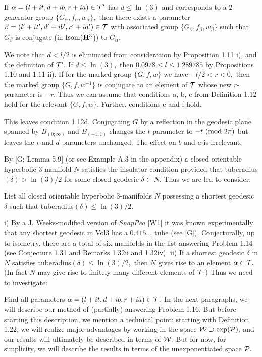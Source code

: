   If $\alpha=(l+it, d+ib, r+ia)\in {\cal T}^{\prime}$ has $d\le \ln(3)$ and
corresponds to a $2$\/{\rm -}\/generator group
$\{G_\alpha,f_\alpha,w_\alpha\},$ then there exists a parameter $\beta=(l^{\prime}+it^{\prime}, d^{\prime}+ib^{\prime}, r^{\prime}+ia^{\prime})\in {\cal T}$ 
with associated group $\{G_\beta,f_\beta, w_\beta\}$ such that $G_\beta$ is conjugate (in ${\rm Isom}({\bf H}^3$)) to $G_\alpha.$ 
\endproclaim

 We note that $d < l/2$ is eliminated from consideration by Proposition 1.11 i), and the definition of ${\cal T}^\prime.$ If $d\le \ln(3),$
then
$0.0978\le l\le 1.289785$ by Propositions 1.10 and 1.11 ii).  If for the marked group $\{G, f, w\}$ we have 
$-l/2<r<0,$ then the marked group
$\{G,f,w^{-1}\}$ is conjugate to an element of ${\cal T}$ whose new
$r$-parameter is $-r.$  Thus we can assume that
conditions a, b, c from Definition 1.12 hold for the relevant $\{G,f,w\}.$  Further,    conditions e and f \pagebreak hold.

This leaves condition 1.12d.  Conjugating $G$ by a
reflection in the geodesic plane spanned
by $B_{(0;\infty)}$ and $B_{(-1;1)}$ changes the $t$-parameter to 
$-t \ ({\rm mod}\ 2\pi)$
but leaves the $r$ and $d$ parameters unchanged.
The effect on $b$ and $a$ is irrelevant.  \enddemo


 
By [G; Lemma 5.9] (or see Example A.3 in the appendix) a closed orientable hyperbolic $3$-manifold $N$
satisfies the insulator condition provided that
tuberadius$(\delta) > \ln(3)/2$ for some closed geodesic $\delta\subset N.$  Thus we
are led to consider:

   List all closed orientable hyperbolic $3$-manifolds $N$
possessing a shortest geodesic $\delta$ such that tuberadius$(\delta)\le \ln(3)/2.$
\enddemo

  i)  By a J. Weeks-modified version of {\it SnapPea} [W1] it was known
experimentally  that any shortest
geodesic in Vol3 has a $0.415\ldots$ tube  (see [G]).  Conjecturally, up to isometry, there are a total of six manifolds in the list answering Problem 1.14 (see Conjecture 1.31 and Remarks 1.32ii and 1.32iv).
ii)  If a shortest geodesic $\delta$ in $N$ satisfies tuberadius$(\delta)\le
\ln(3)/2,$ then $N$ gives
rise to an element $\alpha\in {\cal T}.$  (In fact $N$ may give rise to finitely many different elements of ${\cal T}.$)  
Thus we need to investigate:
\enddemo

  Find all parameters $\alpha=(l+it, d+ib, r+ia) \in {\cal T}.$ 
\enddemo
{}
In the next     paragraphs, we will describe our method of (partially) answering Problem 1.16.  But before starting this description, we
mention a technical point: starting with Definition 1.22, we 
will realize major advantages by working in the space ${\cal W} \supset \exp({\cal P}),$ and
our results will ultimately be described in terms of ${\cal W}.$ But for now, for simplicity,  we will describe the results in terms of the unexponentiated space ${\cal P}.$

